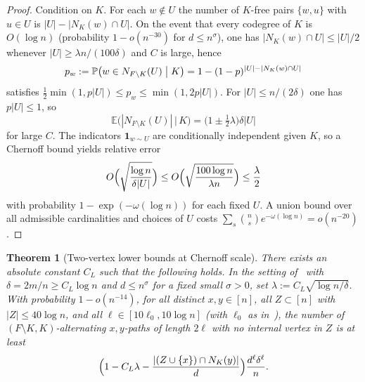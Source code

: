 \documentclass[11pt]{article}
\newtheorem{theorem}{Theorem}
\newcommand{\EE}{\mathbb{E}}
\newcommand{\PP}{\mathbb{P}}
\begin{document}
\begin{proof}
Condition on \(K\). For each \(w\notin U\) the number of \(K\)-free pairs
\(\{w,u\}\) with \(u\in U\) is \(|U|-|N_K(w)\cap U|\).
On the event that every codegree of \(K\) is \(O(\log n)\) (probability
\(1-o(n^{-30})\) for \(d\le n^{\sigma}\)), one has
\(|N_K(w)\cap U|\le|U|/2\) whenever \(|U|\ge\lambda n/(100\delta)\) and \(C\) is large,
hence
\[
p_w:=\PP\bigl(w\in N_{F\setminus K}(U)\bigm|K\bigr)
=1-(1-p)^{|U|-|N_K(w)\cap U|}
\]
satisfies \(\tfrac12\min(1,p|U|)\le p_w\le\min(1,2p|U|)\).
For \(|U|\le n/(2\delta)\) one has \(p|U|\le 1\), so
\[
\EE\bigl(|N_{F\setminus K}(U)|\,\big|\,K\bigr)
=
\bigl(1\pm\tfrac12\lambda\bigr)\delta|U|
\]
for large \(C\).
The indicators \(\mathbf{1}_{w\sim U}\) are conditionally independent given \(K\), so
a Chernoff bound yields relative error
\[
O\Bigl(\sqrt{\frac{\log n}{\delta|U|}}\Bigr)
\le O\Bigl(\sqrt{\frac{100\log n}{\lambda n}}\Bigr)\le\frac{\lambda}{2}
\]
with probability \(1-\exp(-\omega(\log n))\) for each fixed \(U\).
A union bound over all admissible cardinalities and choices of \(U\) costs
\(\sum_s\binom{n}{s}e^{-\omega(\log n)}=o(n^{-20})\).
\end{proof}

\begin{theorem}[Two-vertex lower bounds at Chernoff scale]
\label{thm:path-lower-chernoff}
There exists an absolute constant \(C_L\) such that the following holds.
In the setting of~\cite[Theorem~6.1]{BIM25} with \(\delta=2m/n\ge C_L\log n\) and
\(d\le n^{\sigma}\) for a fixed small \(\sigma>0\), set
\(\lambda:=C_L\sqrt{\log n/\delta}\).
With probability \(1-o(n^{-14})\), for all distinct \(x,y\in[n]\), all
\(Z\subset[n]\) with \(|Z|\le 40\log n\), and all
\(\ell\in[10\ell_0,10\log n]\) (with \(\ell_0\) as in~\cite[§6]{BIM25}), the number of
\((F\setminus K,K)\)-alternating \(x,y\)-paths of length \(2\ell\) with no internal
vertex in \(Z\) is at least
\[
\Bigl(1-C_L\lambda-\frac{|(Z\cup\{x\})\cap N_K(y)|}{d}\Bigr)\frac{d^\ell\delta^\ell}{n}.
\]
\end{theorem}
\end{document}
